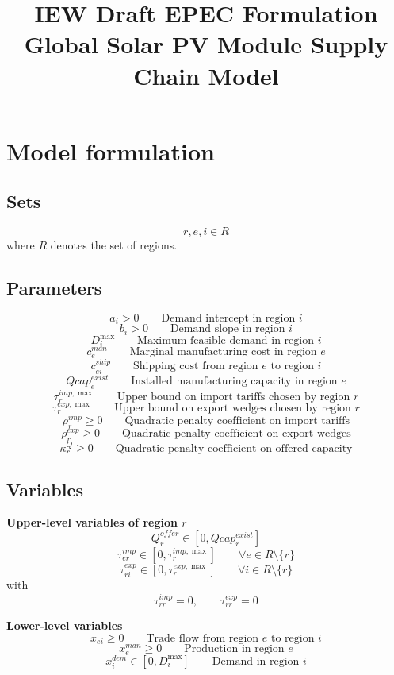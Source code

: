 \documentclass[11pt,a4paper]{article}
\title{IEW Draft EPEC Formulation\\
Global Solar PV Module Supply Chain Model}
\author{}
\date{}
\begin{document}
\maketitle

\section{Model formulation}

\subsection{Sets}
\[
r,e,i \in R
\]
where \(R\) denotes the set of regions.

\subsection{Parameters}
\[
a_i > 0
\qquad\text{Demand intercept in region } i
\]
\[
b_i > 0
\qquad\text{Demand slope in region } i
\]
\[
D_i^{\max}
\qquad\text{Maximum feasible demand in region } i
\]
\[
c_e^{man}
\qquad\text{Marginal manufacturing cost in region } e
\]
\[
c_{ei}^{ship}
\qquad\text{Shipping cost from region } e \text{ to region } i
\]
\[
Qcap_e^{exist}
\qquad\text{Installed manufacturing capacity in region } e
\]
\[
\tau_r^{imp,\max}
\qquad\text{Upper bound on import tariffs chosen by region } r
\]
\[
\tau_r^{exp,\max}
\qquad\text{Upper bound on export wedges chosen by region } r
\]
\[
\rho_r^{imp} \ge 0
\qquad\text{Quadratic penalty coefficient on import tariffs}
\]
\[
\rho_r^{exp} \ge 0
\qquad\text{Quadratic penalty coefficient on export wedges}
\]
\[
\kappa_r^Q \ge 0
\qquad\text{Quadratic penalty coefficient on offered capacity}
\]

\subsection{Variables}

\textbf{Upper-level variables of region \(r\)}
\[
Q_r^{offer} \in [0,Qcap_r^{exist}]
\]
\[
\tau_{er}^{imp} \in [0,\tau_r^{imp,\max}]
\qquad \forall e \in R\setminus\{r\}
\]
\[
\tau_{ri}^{exp} \in [0,\tau_r^{exp,\max}]
\qquad \forall i \in R\setminus\{r\}
\]
with
\[
\tau_{rr}^{imp}=0,\qquad \tau_{rr}^{exp}=0
\]

\textbf{Lower-level variables}
\[
x_{ei}\ge 0
\qquad\text{Trade flow from region } e \text{ to region } i
\]
\[
x_e^{man}\ge 0
\qquad\text{Production in region } e
\]
\[
x_i^{dem}\in [0,D_i^{\max}]
\qquad\text{Demand in region } i
\]
\end{document}
